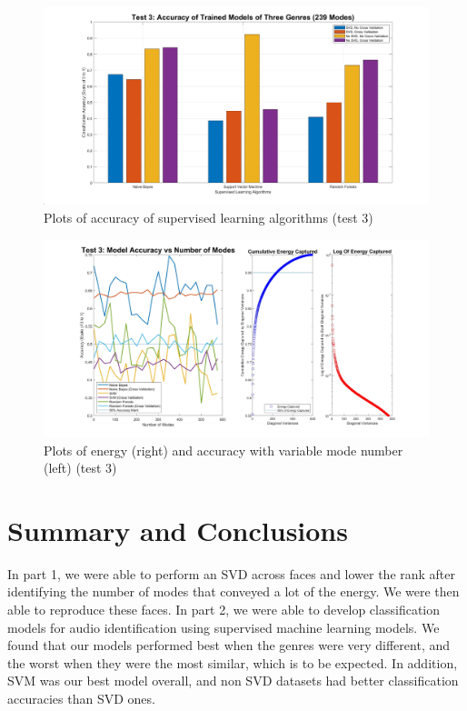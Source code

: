 \documentclass{article}
\begin{document}
\begin{figure}[H]
\begin{center}
\includegraphics[width = 16cm]{acc3}
\caption{\label{fig:scaled_diss}  Plots of accuracy of supervised learning algorithms (test 3)}
\end{center}
\end{figure}
\begin{figure}[H]
\begin{center}
\includegraphics[width = 18cm]{use3}
\caption{\label{fig:scaled_diss} Plots of energy (right) and accuracy with variable mode number (left) (test 3)}
\end{center}
\end{figure}


\section*{\fontsize{19}{15}\selectfont Summary and Conclusions}
In part 1, we were able to perform an SVD across faces and lower the rank after identifying the number of modes that conveyed a lot of the energy. We were then able to reproduce these faces. In part 2, we were able to develop classification models for audio identification using supervised machine learning models. We found that our models performed best when the genres were very different, and the worst when they were the most similar, which is to be expected. In addition, SVM was our best model overall, and non SVD datasets had better classification accuracies than SVD ones.
\pagebreak
\end{document}
